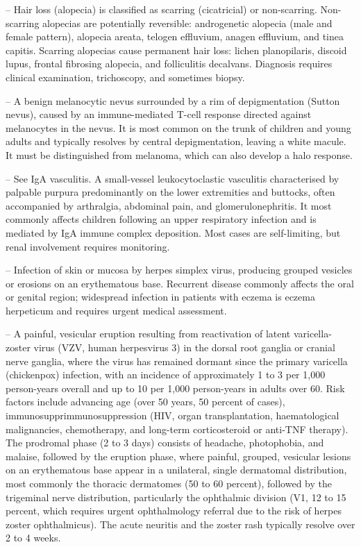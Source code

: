-- Hair loss (alopecia) is classified as scarring (cicatricial) or non-scarring. Non-scarring alopecias are potentially reversible: androgenetic alopecia (male and female pattern), alopecia areata, telogen effluvium, anagen effluvium, and tinea capitis. Scarring alopecias cause permanent hair loss: lichen planopilaris, discoid lupus, frontal fibrosing alopecia, and folliculitis decalvans. Diagnosis requires clinical examination, trichoscopy, and sometimes biopsy.

-- A benign melanocytic nevus surrounded by a rim of depigmentation (Sutton nevus), caused by an immune-mediated T-cell response directed against melanocytes in the nevus. It is most common on the trunk of children and young adults and typically resolves by central depigmentation, leaving a white macule. It must be distinguished from melanoma, which can also develop a halo response.

-- See IgA vasculitis. A small-vessel leukocytoclastic vasculitis characterised by palpable purpura predominantly on the lower extremities and buttocks, often accompanied by arthralgia, abdominal pain, and glomerulonephritis. It most commonly affects children following an upper respiratory infection and is mediated by IgA immune complex deposition. Most cases are self-limiting, but renal involvement requires monitoring.

-- Infection of skin or mucosa by herpes simplex virus, producing grouped vesicles or erosions on an erythematous base. Recurrent disease commonly affects the oral or genital region; widespread infection in patients with eczema is eczema herpeticum and requires urgent medical assessment.

-- A painful, vesicular eruption resulting from reactivation of latent varicella-zoster virus (VZV, human herpesvirus 3) in the dorsal root ganglia or cranial nerve ganglia, where the virus has remained dormant since the primary varicella (chickenpox) infection, with an incidence of approximately 1 to 3 per 1,000 person-years overall and up to 10 per 1,000 person-years in adults over 60. Risk factors include advancing age (over 50 years, 50 percent of cases), immunosupprimmunosuppression (HIV, organ transplantation, haematological malignancies, chemotherapy, and long-term corticosteroid or anti-TNF therapy). The prodromal phase (2 to 3 days) consists of headache, photophobia, and malaise, followed by the eruption phase, where painful, grouped, vesicular lesions on an erythematous base appear in a unilateral, single dermatomal distribution, most commonly the thoracic dermatomes (50 to 60 percent), followed by the trigeminal nerve distribution, particularly the ophthalmic division (V1, 12 to 15 percent, which requires urgent ophthalmology referral due to the risk of herpes zoster ophthalmicus). The acute neuritis and the zoster rash typically resolve over 2 to 4 weeks.

